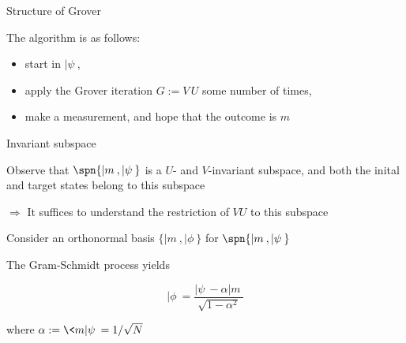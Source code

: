 


\begin{frame}{Structure of Grover}

\bigskip
The algorithm is as follows: 

\bigskip
\begin{itemize}
\item start in $|\psi\>$, 

\bigskip
\item apply the Grover iteration $G := V\, U$ some number of times, 

\bigskip
\item make a measurement, and hope that the outcome is $m$
\end{itemize}
\end{frame}




\begin{frame}{Invariant subspace}

Observe that $\spn\{|m\>,|\psi\>\}$ is a $U$- and $V$-invariant subspace, and both the inital and target states belong to 
this subspace

\bigskip
$\Rightarrow$ It suffices to understand the restriction of $VU$ to this subspace

\bigskip
Consider an orthonormal basis $\{|m\>,|\phi\>\}$ for $\spn\{|m\>,|\psi\>\}$

\bigskip
The Gram-Schmidt process yields

\bigskip
\[
  |\phi\> = \frac{|\psi\> - \alpha |m\>}{\sqrt{1-\alpha^2}}
\]

\bigskip
where $\alpha := \<m|\psi\> = 1/\sqrt{N}$
\end{frame}




